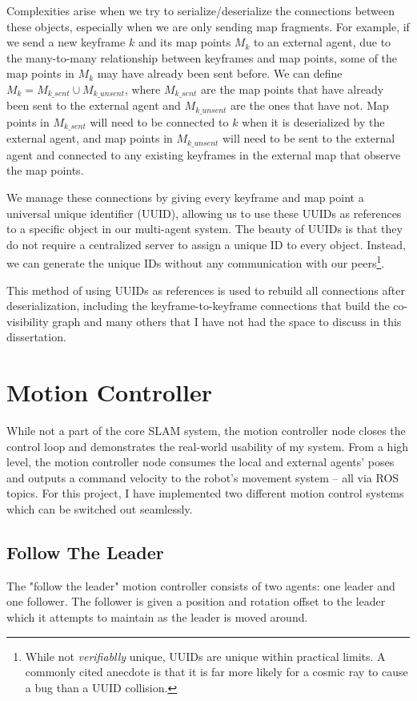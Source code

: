Complexities arise when we try to serialize/deserialize the connections between these objects, especially when we are only sending map fragments. For example, if we send a new keyframe $k$ and its map points $M_k$ to an external agent, due to the many-to-many relationship between keyframes and map points, some of the map points in $M_k$ may have already been sent before. We can define $M_k = M_{k\_sent} \cup M_{k\_unsent}$, where $M_{k\_sent}$ are the map points that have already been sent to the external agent and $M_{k\_unsent}$ are the ones that have not. Map points in $M_{k\_sent}$ will need to be connected to $k$ when it is deserialized by the external agent, and map points in $M_{k\_unsent}$ will need to be sent to the external agent and connected to any existing keyframes in the external map that observe the map points.

We manage these connections by giving every keyframe and map point a universal unique identifier (UUID), allowing us to use these UUIDs as references to a specific object in our multi-agent system. The beauty of UUIDs is that they do not require a centralized server to assign a unique ID to every object. Instead, we can generate the unique IDs without any communication with our peers\footnote[1]{While not \textit{verifiablly} unique, UUIDs are unique within practical limits. A commonly cited anecdote is that it is far more likely for a cosmic ray to cause a bug than a UUID collision.}.

This method of using UUIDs as references is used to rebuild all connections after deserialization, including the keyframe-to-keyframe connections that build the co-visibility graph and many others that I have not had the space to discuss in this dissertation.

\section{Motion Controller}
\label{sec:motion-controller}
While not a part of the core SLAM system, the motion controller node closes the control loop and demonstrates the real-world usability of my system. From a high level, the motion controller node consumes the local and external agents' poses and outputs a command velocity to the robot's movement system – all via ROS topics. For this project, I have implemented two different motion control systems which can be switched out seamlessly.

\subsection{Follow The Leader}
\label{sec:follow-the-leader}
The "follow the leader" motion controller consists of two agents: one leader and one follower. The follower is given a position and rotation offset to the leader which it attempts to maintain as the leader is moved around.

